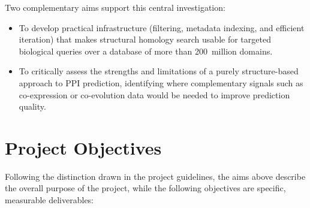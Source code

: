 Two complementary aims support this central investigation:
\begin{itemize}
    \item To develop practical infrastructure (filtering, metadata indexing, and efficient iteration) that makes structural homology search usable for targeted biological queries over a database of more than 200~million domains.
    \item To critically assess the strengths and limitations of a purely structure-based approach to PPI prediction, identifying where complementary signals such as co-expression or co-evolution data would be needed to improve prediction quality.
\end{itemize}


\section{Project Objectives}
\label{sec:project-objectives}

Following the distinction drawn in the project guidelines, the aims above describe the overall purpose of the project, while the following objectives are specific, measurable deliverables:

